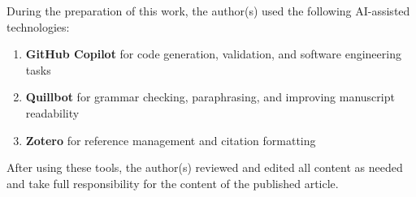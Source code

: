 \documentclass[preprint,review,12pt]{elsarticle}
\begin{document}
During the preparation of this work, the author(s) used the following AI-assisted technologies:

\begin{enumerate}
    \item \textbf{GitHub Copilot} for code generation, validation, and software engineering tasks
    \item \textbf{Quillbot} for grammar checking, paraphrasing, and improving manuscript readability
    \item \textbf{Zotero} for reference management and citation formatting
\end{enumerate}

After using these tools, the author(s) reviewed and edited all content as needed and take full responsibility for the content of the published article.



\end{document}
